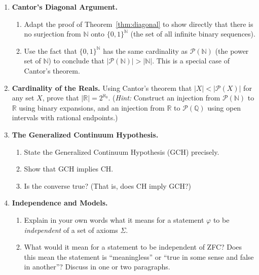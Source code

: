 \begin{enumerate}

    \item \textbf{Cantor's Diagonal Argument.}
    \begin{enumerate}
        \item Adapt the proof of Theorem~\ref{thm:diagonal} to show directly that there is no surjection from $\mathbb{N}$ onto $\{0,1\}^{\mathbb{N}}$ (the set of all infinite binary sequences).
        \item Use the fact that $\{0,1\}^{\mathbb{N}}$ has the same cardinality as $\mathcal{P}(\mathbb{N})$ (the power set of $\mathbb{N}$) to conclude that $|\mathcal{P}(\mathbb{N})| > |\mathbb{N}|$. This is a special case of Cantor's theorem.
    \end{enumerate}

    \item \textbf{Cardinality of the Reals.}
    Using Cantor's theorem that $|X| < |\mathcal{P}(X)|$ for any set $X$, prove that $|\mathbb{R}| = 2^{\aleph_0}$. (\emph{Hint:} Construct an injection from $\mathcal{P}(\mathbb{N})$ to $\mathbb{R}$ using binary expansions, and an injection from $\mathbb{R}$ to $\mathcal{P}(\mathbb{Q})$ using open intervals with rational endpoints.)

    \item \textbf{The Generalized Continuum Hypothesis.}
    \begin{enumerate}
        \item State the Generalized Continuum Hypothesis (GCH) precisely.
        \item Show that GCH implies CH.
        \item Is the converse true? (That is, does CH imply GCH?)
    \end{enumerate}

    \item \textbf{Independence and Models.}
    \begin{enumerate}
        \item Explain in your own words what it means for a statement $\varphi$ to be \emph{independent} of a set of axioms $\Sigma$.
        \item What would it mean for a statement to be independent of ZFC? Does this mean the statement is ``meaningless'' or ``true in some sense and false in another''? Discuss in one or two paragraphs.
    \end{enumerate}


\end{enumerate}
